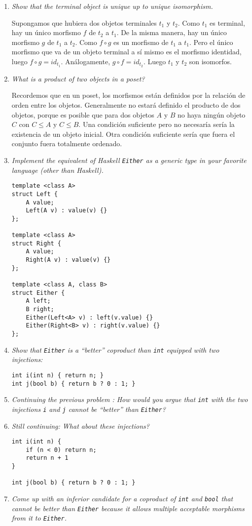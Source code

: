 \documentclass[11pt]{article}
\begin{document}
\begin{enumerate}
\item \textit{Show that the terminal object is unique up to unique isomorphism.}

Supongamos que hubiera dos objetos terminales $t_1$ y $t_2$. Como $t_1$ es terminal, hay un único morfismo $f$ de $t_2$ a $t_1$. De la misma manera, hay un único morfismo $g$ de $t_1$ a $t_2$. Como $f \circ g$ es un morfismo de $t_1$ a $t_1$. Pero el único morfismo que va de un objeto terminal a sí mismo es el morfismo identidad, luego $f \circ g = id_{t_1}$. Análogamente, $g \circ f = id_{t_2}$. Luego $t_1$ y $t_2$ son isomorfos. 

\item \textit{What is a product of two objects in a poset?}

Recordemos que en un poset, los morfismos están definidos por la relación de orden entre los objetos. Generalmente no estará definido el producto de dos objetos, porque es posible que para dos objetos $A$ y $B$ no haya ningún objeto $C$ con $C ≤ A$ y $C ≤ B$. Una condición suficiente pero no necesaría sería la existencia de un objeto inicial. Otra condición suficiente sería que fuera el conjunto fuera totalmente ordenado.

\item \textit{Implement the equivalent of Haskell \texttt{Either} as a generic type in your favorite language (other than Haskell).}
\begin{lstlisting}
template <class A>
struct Left {
	A value;
	Left(A v) : value(v) {}
};

template <class A>
struct Right {
	A value;
	Right(A v) : value(v) {}
};

template <class A, class B>
struct Either {
	A left;
	B right;
	Either(Left<A> v) : left(v.value) {}
	Either(Right<B> v) : right(v.value) {}
};
\end{lstlisting}

\item \textit{Show that \texttt{Either} is a ``better'' coproduct than \texttt{int} equipped with two injections:}
\begin{lstlisting}
int i(int n) { return n; }
int j(bool b) { return b ? 0 : 1; }
\end{lstlisting}

\item \textit{Continuing the previous problem : How would you argue that \texttt{int} with the two injections \texttt{i} and \texttt{j} cannot be ``better'' than \texttt{Either}?}

\item \textit{Still continuing: What about these injections?}
\begin{lstlisting}
int i(int n) { 
	if (n < 0) return n;
	return n + 1
}

int j(bool b) { return b ? 0 : 1; }
\end{lstlisting}

\item \textit{Come up with an inferior candidate for a coproduct of \texttt{int} and \texttt{bool} that cannot be better than \texttt{Either} because it allows multiple acceptable morphisms from it to \texttt{Either}.}
\end{enumerate}
\end{document}

